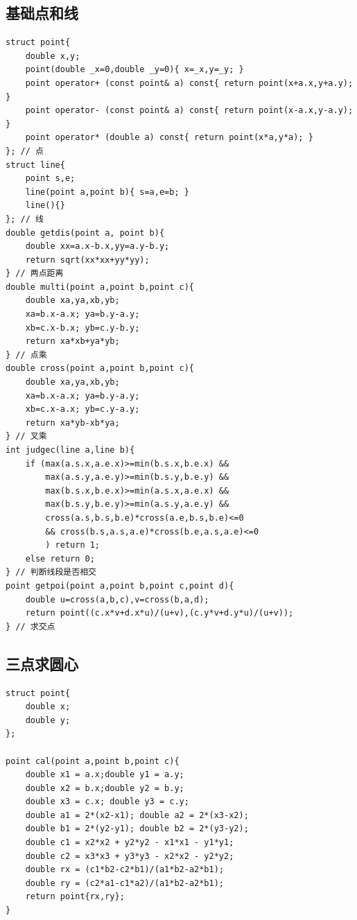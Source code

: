 \documentclass[a4]{ctexart}
\begin{document}
\subsection{基础点和线}
\begin{lstlisting}
struct point{
    double x,y;
    point(double _x=0,double _y=0){ x=_x,y=_y; }
    point operator+ (const point& a) const{ return point(x+a.x,y+a.y); }
    point operator- (const point& a) const{ return point(x-a.x,y-a.y); }
    point operator* (double a) const{ return point(x*a,y*a); }
}; // 点
struct line{
    point s,e;
    line(point a,point b){ s=a,e=b; }
    line(){}
}; // 线
double getdis(point a, point b){
    double xx=a.x-b.x,yy=a.y-b.y;
    return sqrt(xx*xx+yy*yy);
} // 两点距离
double multi(point a,point b,point c){
    double xa,ya,xb,yb;
    xa=b.x-a.x; ya=b.y-a.y;
    xb=c.x-b.x; yb=c.y-b.y;
    return xa*xb+ya*yb;
} // 点乘
double cross(point a,point b,point c){
    double xa,ya,xb,yb;
    xa=b.x-a.x; ya=b.y-a.y;
    xb=c.x-a.x; yb=c.y-a.y;
    return xa*yb-xb*ya;
} // 叉乘
int judgec(line a,line b){
    if (max(a.s.x,a.e.x)>=min(b.s.x,b.e.x) &&
        max(a.s.y,a.e.y)>=min(b.s.y,b.e.y) &&
        max(b.s.x,b.e.x)>=min(a.s.x,a.e.x) &&
        max(b.s.y,b.e.y)>=min(a.s.y,a.e.y) &&
        cross(a.s,b.s,b.e)*cross(a.e,b.s,b.e)<=0 
        && cross(b.s,a.s,a.e)*cross(b.e,a.s,a.e)<=0
        ) return 1;
    else return 0;
} // 判断线段是否相交
point getpoi(point a,point b,point c,point d){
    double u=cross(a,b,c),v=cross(b,a,d);
    return point((c.x*v+d.x*u)/(u+v),(c.y*v+d.y*u)/(u+v));
} // 求交点
\end{lstlisting}

\subsection{三点求圆心}
\begin{lstlisting}
struct point{
	double x;
	double y;
};

point cal(point a,point b,point c){
	double x1 = a.x;double y1 = a.y;
	double x2 = b.x;double y2 = b.y;
	double x3 = c.x; double y3 = c.y;
	double a1 = 2*(x2-x1); double a2 = 2*(x3-x2);
	double b1 = 2*(y2-y1); double b2 = 2*(y3-y2);
	double c1 = x2*x2 + y2*y2 - x1*x1 - y1*y1;
	double c2 = x3*x3 + y3*y3 - x2*x2 - y2*y2;
	double rx = (c1*b2-c2*b1)/(a1*b2-a2*b1);
	double ry = (c2*a1-c1*a2)/(a1*b2-a2*b1);
	return point{rx,ry};
}
\end{lstlisting}
\end{document}
